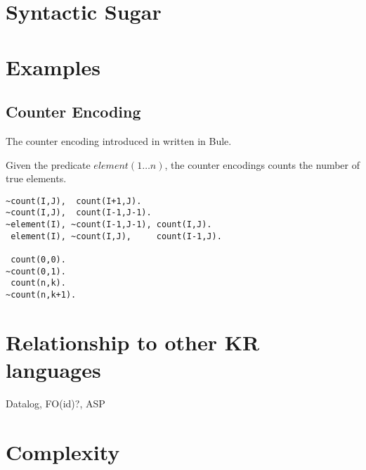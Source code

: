 \documentclass{new_tlp}
\begin{document}
\section{Syntactic Sugar}

\section{Examples}

\subsection{Counter Encoding}

The counter encoding introduced in \cite{sinz2005} written in Bule. 

Given the predicate $element(1\ldots n)$, 
the counter encodings counts the number of true elements.

\begin{lstlisting}
~count(I,J),  count(I+1,J).
~count(I,J),  count(I-1,J-1).
~element(I), ~count(I-1,J-1), count(I,J).
 element(I), ~count(I,J),     count(I-1,J).

 count(0,0).
~count(0,1).
 count(n,k).
~count(n,k+1).
\end{lstlisting}

\section{Relationship to other KR languages}

Datalog, FO(id)?, ASP

\section{Complexity}



\end{document}
